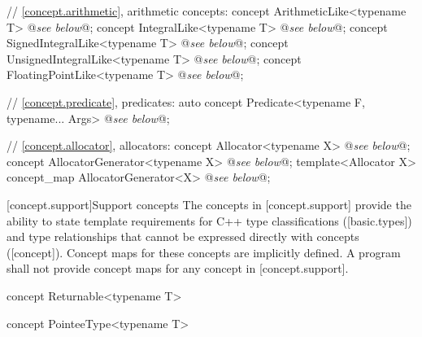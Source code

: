 \documentclass[american,twoside]{book}
\begin{document}
\begin{codeblock}
{  // \ref{concept.arithmetic}, arithmetic concepts:
  concept ArithmeticLike<typename T> @\textit{see below}@;
  concept IntegralLike<typename T> @\textit{see below}@;
  concept SignedIntegralLike<typename T> @\textit{see below}@;
  concept UnsignedIntegralLike<typename T> @\textit{see below}@;
  concept FloatingPointLike<typename T> @\textit{see below}@;

  // \ref{concept.predicate}, predicates:
  auto concept Predicate<typename F, typename... Args> @\textit{see below}@;

  // \ref{concept.allocator}, allocators:
  concept Allocator<typename X> @\textit{see below}@;
  concept AllocatorGenerator<typename X> @\textit{see below}@;
  template<Allocator X> concept_map AllocatorGenerator<X> @\textit{see below}@;
}
\end{codeblock}

[concept.support]{Support concepts}
\pnum
The concepts in [concept.support] provide the ability to state
template requirements for C++ type classifications ([basic.types]) and
type relationships that cannot be expressed directly with concepts
([concept]). Concept maps for these concepts are implicitly defined.
A program shall not provide concept maps for any concept in
[concept.support].

\begin{itemdecl}
concept Returnable<typename T> { }
\end{itemdecl}

\begin{itemdescr}
\pnum
{}

\pnum
{}
\end{itemdescr}

\begin{itemdecl}
concept PointeeType<typename T> { }
\end{itemdecl}

\begin{itemdescr}
\pnum
{}

\pnum 
{}
\end{itemdescr}
\end{document}
